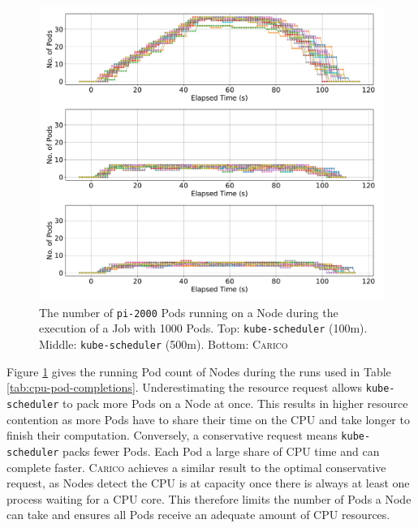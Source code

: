 \begin{figure}[ht!]
    \centering
    \includegraphics[width=\textwidth]{images/pi-running-pods.pdf}
    \caption{The number of \texttt{pi-2000} Pods running on a Node during the
    execution of a Job with 1000 Pods. Top: \texttt{kube-scheduler} (100m).
    Middle: \texttt{kube-scheduler} (500m). Bottom: \textsc{Carico}}
    \label{fig:pi-2000-1000x-pod-running}
\end{figure}

Figure \ref{fig:pi-2000-1000x-pod-running} gives the running Pod count of Nodes
during the runs used in Table \ref{tab:cpu-pod-completions}. Underestimating the
resource request allows \texttt{kube-scheduler} to pack more Pods on a Node at
once. This results in higher resource contention as more Pods have to share
their time on the CPU and take longer to finish their computation. Conversely,
a conservative request means \texttt{kube-scheduler} packs
fewer Pods. Each Pod a large share of CPU time and can complete faster.
\textsc{Carico} achieves a similar result to the optimal conservative request,
as Nodes detect the CPU is at capacity once there is always at least one process
waiting for a CPU core. This therefore limits the number of Pods a Node can take
and ensures all Pods receive an adequate amount of CPU resources.

